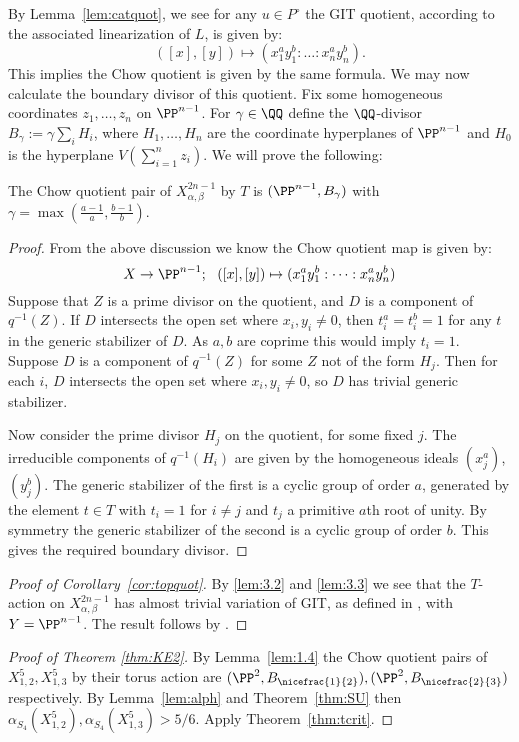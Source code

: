 %
%
%
By Lemma~\ref{lem:catquot}, we see for any \(u \in P^\circ\) the GIT quotient, according to the associated linearization of \(L\), is given by:
\[
([x],[y]) \mapsto (x_1^a y_1^b: \dots : x_n^a y_n^b).
\]
This implies the Chow quotient is given by the same formula. We may now calculate the boundary divisor of this quotient. Fix some homogeneous coordinates \(z_1,\dots,z_n\) on \(\PP^{n-1}\). For \(\gamma \in \QQ\) define the \(\QQ\)-divisor \(B_\gamma := \gamma \sum_i H_i\), where \(H_1,\dots,H_n\) are the coordinate hyperplanes of \(\PP^{n-1}\) and \(H_0\) is the hyperplane \(V( \sum_{i=1}^n z_i)\). We will prove the following:
\begin{lemma}\label{lem:1.4}
The Chow quotient pair of \(X_{\alpha,\beta}^{2n-1}\) by \(T\) is \((\PP^{n-1},B_\gamma)\) with \(\gamma = \max \left(\frac{a-1}{a}, \frac{b - 1}{b} \right)\).
\end{lemma}
\begin{proof}
From the above discussion we know the Chow quotient map is given by:
\[
X \to \PP^{n-1}; \ \ ([x],[y]) \mapsto (x_1^a y_1^b: \dots : x_n^a y_n^b )
\]
Suppose that \(Z\) is a prime divisor on the quotient, and \(D\) is a component of \(q^{-1}(Z)\). If \(D\) intersects the open set where \(x_i,y_i \neq 0\), then \(t_i^a = t_i^b = 1\) for any \(t\) in the generic stabilizer of \(D\). As \(a,b\) are coprime this would imply \(t_i = 1\). Suppose \(D\) is a component of \(q^{-1}(Z)\) for some \(Z\) not of the form \(H_j\). Then for each \(i\), \(D\) intersects the open set where \(x_i,y_i \neq 0\), so \(D\) has trivial generic stabilizer.

Now consider the prime divisor \(H_j\) on the quotient, for some fixed \(j\). The irreducible components of \(q^{-1}(H_i)\) are given by the homogeneous ideals \((x_j^a)\), \((y_j^b)\). The generic stabilizer of the first is a cyclic group of order \(a\), generated by the element \(t \in T\) with \(t_i = 1\) for \(i \neq j\) and \(t_j\) a primitive \(a\)th root of unity. By symmetry the generic stabilizer of the second is a cyclic group of order \(b\). This gives the required boundary divisor.
\end{proof}
\begin{proof}[Proof of Corollary~\ref{cor:topquot}]
By \ref{lem:3.2} and \ref{lem:3.3} we see that the \(T\)-action on \(X^{2n-1}_{\alpha,\beta}\) has almost trivial variation of GIT, as defined in \cite[Definition 2.7]{suess18-2}, with \(Y = \PP^{n-1}\). The result follows by \cite[Proposition 2.9]{suess18-2}.
\end{proof}
\begin{proof}[Proof of Theorem \ref{thm:KE2}]
By Lemma~\ref{lem:1.4} the Chow quotient pairs of \(X_{1,2}^{5},X_{1,3}^{5}\) by their torus action are \((\PP^2,B_{\nicefrac{1}{2}}), (\PP^2,B_{\nicefrac{2}{3}})\) respectively. By Lemma~\ref{lem:alph} and Theorem~\ref{thm:SU} then \(\alpha_{S_4}(X_{1,2}^{5}),\alpha_{S_4}(X_{1,3}^{5}) > 5/6\). Apply Theorem~\ref{thm:tcrit}.
\end{proof}

